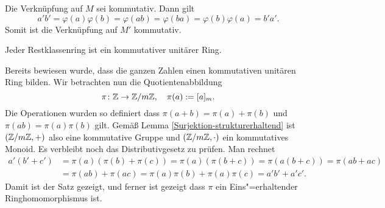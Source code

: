 Die Verknüpfung auf $M$ sei kommutativ. Dann gilt
\[a'b' = \varphi(a)\varphi(b) = \varphi(ab) = \varphi(ba) = \varphi(b)\varphi(a) = b'a'.\]
Somit ist die Verknüpfung auf $M'$ kommutativ.\,\qedsymbol

\begin{Satz} Jeder Restklassenring ist ein kommutativer unitärer Ring.
\end{Satz}
 Bereits bewiesen wurde, dass die ganzen Zahlen einen
kommutativen unitären Ring bilden. Wir betrachten nun die
Quotientenabbildung
\[\pi\colon\mathbb Z \to \mathbb Z/m\mathbb Z,\quad \pi(a):=[a]_m.\]
Die Operationen wurden so definiert dass
$\pi(a+b)=\pi(a)+\pi(b)$ und $\pi(ab)=\pi(a)\pi(b)$ gilt.
Gemäß Lemma \ref{Surjektion-strukturerhaltend} ist $(\mathbb Z/m\mathbb Z,+)$ also
eine kommutative Gruppe und $(\mathbb Z/m\mathbb Z,\cdot)$ ein kommutatives
Monoid. Es verbleibt noch das Distributivgesetz zu prüfen. Man rechnet
\begin{align*}
a'(b'+c') &= \pi(a)(\pi(b)+\pi(c)) = \pi(a)(\pi(b+c))
= \pi(a(b+c)) = \pi(ab+ac)\\
&= \pi(ab)+\pi(ac) = \pi(a)\pi(b)+\pi(a)\pi(c) = a'b'+a'c'.
\end{align*}
Damit ist der Satz gezeigt, und ferner ist gezeigt dass $\pi$ ein
Eins"=erhaltender Ringhomomorphismus ist.\,\qedsymbol
